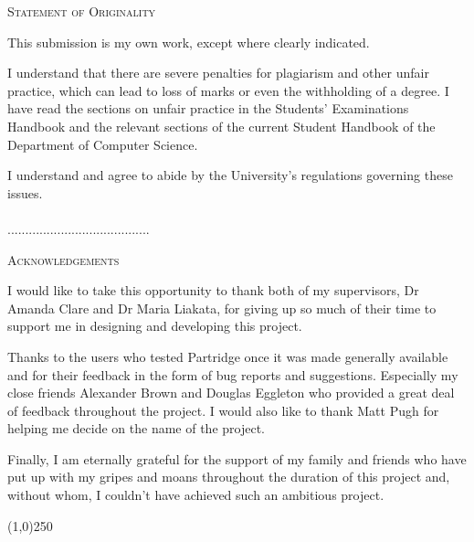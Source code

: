 \documentclass[11pt,a4paper,oneside]{book}
\begin{document}



\setlength{\parindent}{0pt}
\setlength{\parskip}{1.5ex plus 0.5ex minus 0.2ex}



\thispagestyle{plain}

\begin{center}
\textsc{\large Statement of Originality}
\end{center}

This submission is my own work, except where clearly indicated.  

I understand that there are severe penalties for plagiarism and other unfair
practice, which can lead to loss of marks or even the withholding of a degree.
I have read the sections on unfair practice in the Students’ Examinations
Handbook and the relevant sections of the current Student Handbook of the
Department of Computer Science.  

I understand and agree to abide by the University’s regulations governing these
issues.\\\\

........................................

\pagebreak
\thispagestyle{plain}

\begin{center}
\textsc{\large Acknowledgements}
\end{center}

I would like to take this opportunity to thank both of my
supervisors, Dr Amanda Clare and Dr Maria Liakata, for giving up so much of their
time to support me in designing and developing this project. 

Thanks to the users who tested Partridge once it was made generally available
and for their feedback in the form of bug reports and suggestions. Especially
my close friends Alexander Brown and Douglas Eggleton who provided a great deal
of feedback throughout the project. I would also like to thank Matt Pugh for
helping me decide on the name of the project.

Finally, I am eternally grateful for the support of my family and friends who
have put up with my gripes and moans throughout the duration of this project
and, without whom, I couldn't have achieved such an ambitious project.

\begin{center}
\line(1,0){250}
\end{center}
\end{document}
